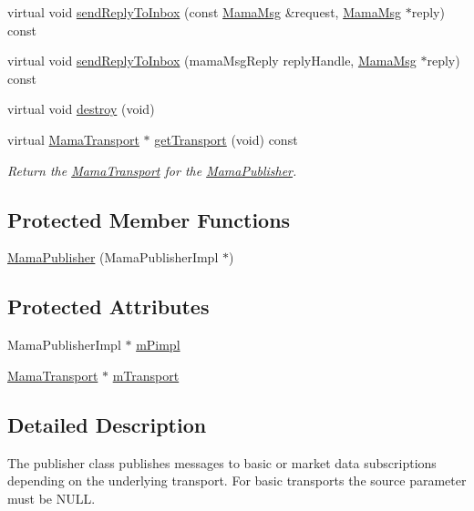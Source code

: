 \begin{DoxyCompactItemize}
\item 
virtual void \hyperlink{classWombat_1_1MamaPublisher_a5a793bd5ce83062bef1d9c301394846c}{sendReplyToInbox} (const \hyperlink{classWombat_1_1MamaMsg}{MamaMsg} \&request, \hyperlink{classWombat_1_1MamaMsg}{MamaMsg} $\ast$reply) const 
\item 
virtual void \hyperlink{classWombat_1_1MamaPublisher_a4027880ca8ff1da97d8dfdd8a6ab0324}{sendReplyToInbox} (mamaMsgReply replyHandle, \hyperlink{classWombat_1_1MamaMsg}{MamaMsg} $\ast$reply) const 
\item 
virtual void \hyperlink{classWombat_1_1MamaPublisher_acd7d75ae898eb5cc33851ba534c36134}{destroy} (void)
\item 
virtual \hyperlink{classWombat_1_1MamaTransport}{MamaTransport} $\ast$ \hyperlink{classWombat_1_1MamaPublisher_abf6c408f0ccb59c2169ad33f1f557969}{getTransport} (void) const 
\begin{DoxyCompactList}\small\item\em Return the \hyperlink{classWombat_1_1MamaTransport}{MamaTransport} for the \hyperlink{classWombat_1_1MamaPublisher}{MamaPublisher}. \item\end{DoxyCompactList}\end{DoxyCompactItemize}
\subsection*{Protected Member Functions}
\begin{DoxyCompactItemize}
\item 
\hyperlink{classWombat_1_1MamaPublisher_ae1b9a885437a0b6509937eb57586671c}{MamaPublisher} (MamaPublisherImpl $\ast$)
\end{DoxyCompactItemize}
\subsection*{Protected Attributes}
\begin{DoxyCompactItemize}
\item 
MamaPublisherImpl $\ast$ \hyperlink{classWombat_1_1MamaPublisher_a62eebdff64fcd63293122af14757fc5b}{mPimpl}
\item 
\hyperlink{classWombat_1_1MamaTransport}{MamaTransport} $\ast$ \hyperlink{classWombat_1_1MamaPublisher_a1b883709ebf27895ef4b16c25e18ad97}{mTransport}
\end{DoxyCompactItemize}


\subsection{Detailed Description}
The publisher class publishes messages to basic or market data subscriptions depending on the underlying transport. For basic transports the source parameter must be NULL. 

